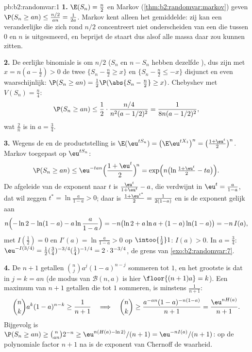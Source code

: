 \begin{solution}{pb:b2:randomvar:1}
\textbf{1.} $\E(S_n) = \frac n2$ en Markov
(\cref{thm:b2:randomvar:markov}) geven $\P(S_n \geq an) \leq
\frac{n/2}{an} = \frac1{2a}$. Markov kent alleen het gemiddelde:
zij kan een veranderlijke die zich rond $n/2$ concentreert niet
onderscheiden van een die tussen $0$ en $n$ is uitgesmeerd, en
beprijst de staart dus alsof alle massa daar zou kunnen zitten.

\textbf{2.} De eerlijke binomiale  is  om $n/2$
($S_n$ en $n - S_n$ hebben dezelfde ), dus zijn met $x =
n(a - \frac12) > 0$ de twee  $\{S_n - \frac n2 \geq
x\}$ en $\{S_n - \frac n2 \leq -x\}$ disjunct en even
waarschijnlijk: $\P(S_n \geq an) = \frac12\P(\abs{S_n - \frac n2}
\geq x)$. Chebyshev met $V(S_n) = \frac n4$:
\[
\P(S_n \geq an)
\leq \frac12\cdot\frac{n/4}{n^2(a - 1/2)^2}
= \frac1{8n(a - 1/2)^2},
\]
wat $\frac2n$ is in $a = \frac34$.

\textbf{3.} Wegens de  en de productstelling is
$\E(\eu^{tS_n}) = \bigl(\E \eu^{tX_1}\bigr)^n = \bigl(\frac{1 +
\eu^t}2\bigr)^n$. Markov toegepast op $\eu^{tS_n}$:
\[
\P(S_n \geq an) \leq \eu^{-tan}\Bigl(\frac{1 +
\eu^t}2\Bigr)^{\!n} = \exp\Bigl(n\bigl(\ln\tfrac{1 +
\eu^t}2 - ta\bigr)\Bigr).
\]
De afgeleide van de exponent naar $t$ is $\frac{\eu^t}{1 + \eu^t} -
a$, die verdwijnt in $\eu^t = \frac a{1-a}$, dat wil zeggen $t^* =
\ln\frac a{1-a} > 0$; daar is $\frac{1 + \eu^{t^*}}2 =
\frac1{2(1-a)}$ en is de exponent gelijk aan
\[
n\Bigl(-\ln 2 - \ln(1-a) - a\ln\frac a{1-a}\Bigr)
= -n\bigl(\ln2 + a\ln a + (1-a)\ln(1-a)\bigr) = -n\,I(a),
\]
met $I(\frac12) = 0$ en $I'(a) = \ln\frac a{1-a} > 0$ op
$\intoo{\frac12}1$: $I(a) > 0$. In $a = \frac34$: $\eu^{-I(3/4)} =
\frac12(\tfrac34)^{-3/4}(\tfrac14)^{-1/4} = 2\cdot3^{-3/4}$, de
grens van \cref{exo:b2:randomvar:7}.

\textbf{4.} De $n + 1$ getallen $\binom nja^j(1-a)^{n-j}$ sommeren
tot $1$, en het grootste is dat in $j = k = an$ (de modus van
$\mathcal B(n, a)$ is hier $\floor{(n+1)a} = k$). Een maximum van
$n + 1$ getallen die tot $1$ sommeren, is minstens $\frac1{n+1}$:
\[
\binom nk a^k(1-a)^{n-k} \geq \frac1{n+1}
\quad\Longrightarrow\quad
\binom nk \geq \frac{a^{-an}(1-a)^{-n(1-a)}}{n+1}
= \frac{\eu^{nH(a)}}{n+1}.
\]
Bijgevolg is $\P(S_n \geq an) \geq \binom{n}{an}2^{-n} \geq
\eu^{n(H(a) - \ln2)}/(n+1) = \eu^{-nI(a)}/(n+1)$: op de
polynomiale factor $n + 1$ na is de exponent van Chernoff de
waarheid.


\end{solution}
